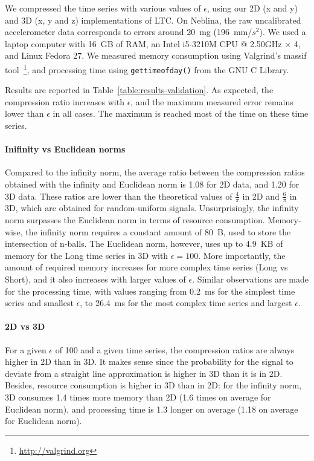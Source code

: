 \documentclass[10pt, conference, compsocconf]{IEEEtran}
\newcommand{\todo}[1]{\marginpar{\parbox{18mm}{\flushleft\tiny\color{red}\textbf{TODO}:
      #1}}}
\begin{document}
We compressed the time series with various values of $\epsilon$, using 
our 2D (x and y) and 3D (x, y and z) implementations of LTC. On 
Neblina, the raw uncalibrated accelerometer data corresponds to errors 
around 20~mg (196~mm/$s^2$). \todo{Check g units} We used a 
laptop computer with 16~GB of RAM, an Intel i5-3210M CPU @ 2.50GHz 
× 4, and Linux Fedora 27. We measured memory consumption using 
Valgrind's massif 
tool~\cite{nethercote2006building}\footnote{\url{http://valgrind.org}}, 
and processing time using \texttt{gettimeofday()} from the GNU C 
Library. 

Results are reported in Table~\ref{table:results-validation}. 
As expected, the compression ratio increases with $\epsilon$, and the 
maximum measured error remains lower than $\epsilon$ in all cases. The 
maximum is reached most of the time on these time series.

\paragraph{Inifinity vs Euclidean norms}
Compared to the infinity norm, the average ratio between the compression ratios obtained
with the infinity and Euclidean norm is 1.08 for 2D data, and 1.20 
for 3D data. These ratios are lower than the theoretical values of 
$\frac{4}{\pi}$ in 2D and $\frac{6}{\pi}$ in 3D, which are obtained for 
random-uniform signals. Unsurprisingly, the infinity norm surpasses the 
Euclidean norm in terms of resource consumption. Memory-wise, the 
infinity norm requires a constant amount of 80~B, used to store the 
intersection of n-balls. The Euclidean norm, however, uses up to 4.9~KB of memory 
for the Long time series in 3D with $\epsilon=100$. More importantly, 
the amount of required memory increases for more complex time series 
(Long vs Short), and it also increases with larger 
values of $\epsilon$. Similar observations are made for the processing 
time, with values ranging from 0.2~ms for the simplest time series and 
smallest $\epsilon$, to 26.4~ms for the most complex time series and 
largest $\epsilon$. 

\paragraph{2D vs 3D}
For a given $\epsilon$ of 100 and a given time series, the compression 
ratios are always higher in 2D than in 3D. It makes sense since the 
probability for the signal to deviate from a straight line 
approximation is higher in 3D than it is in 2D. Besides, resource 
consumption is higher in 3D than in 2D: for the infinity norm, 3D 
consumes 1.4 times more memory than 2D (1.6 times on average for 
Euclidean norm), and processing time is 1.3 longer on average (1.18 on 
average for Euclidean norm).
\end{document}
